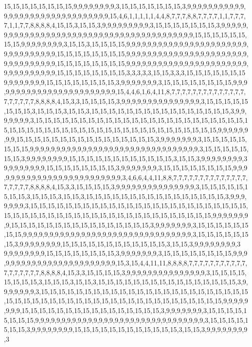 15,15,15,15,15,15,15,15,9,9,9,9,9,9,9,9,3,15,15,15,15,15,15,15,3,9,9,9,9,9,9,9,9,9,9,9,9,9,9,9,9,9,9,9,9,9,9,9,9,9,9,9,9,9,9,9,15,4,6,1,1,1,1,1,4,4,8,7,7,7,8,8,7,7,7,7,1,1,7,7,7,7,1,1,7,7,8,8,8,8,4,15,15,3,15,15,3,9,9,9,9,9,9,9,9,9,3,15,15,15,15,15,15,15,3,9,9,9,9,9,9,9,9,9,9,9,9,9,9,9,9,9,9,9,9,9,9,9,9,9,9,9,9,9,9,9,9,9,9,9,9,9,9,9,9,9,15,15,15,15,15,15,15,15,9,9,9,9,9,9,9,9,3,15,15,3,15,15,15,15,9,9,9,9,9,9,9,9,9,9,9,9,9,9,9,9,9,9,9,9,9,9,9,9,9,9,9,9,9,9,9,9,9,15,15,15,15,15,15,15,15,9,9,9,9,9,9,9,9,9,9,9,9,9,9,9,9,9,9,9,9,9,9,9,9,9,9,9,9,9,9,9,9,9,15,15,15,15,15,15,15,15,9,9,9,9,9,9,9,9,9,9,9,9,9,9,9,9,9,9,9,9,9,9,9,9,9,9,9,9,9,9,9,9,9,15,15,15,15,15,15,15,15,3,3,3,3,3,15,15,3,3,3,15,15,15,15,15,15,15
9,9,9,9,9,9,9,9,15,15,15,15,15,15,15,15,3,9,9,9,9,9,9,9,3,15,15,15,15,15,15,15,15,9,9,9,9,9,9,9,9,9,9,9,9,9,9,9,9,9,9,9,9,9,9,9,9,15,4,4,6,1,6,4,11,8,7,7,7,7,7,7,7,7,7,7,7,7,7,7,7,7,7,7,7,7,8,8,8,8,4,15,3,3,15,15,15,15,3,9,9,9,9,9,9,9,9,9,9,9,9,9,9,9,3,15,15,15,15,15,15,15,15,3,15,15,15,3,15,15,3,15,15,15,15,15,15,15,15,15,15,15,15,15,15,15,15,3,9,9,9,9,9,9,9,3,15,15,15,15,15,15,15,15,15,15,15,15,15,15,15,15,15,15,15,15,15,15,15,15,15,15,15,15,15,15,15,15,15,15,15,15,15,15,15,15,15,15,15,15,15,15,15,15,15,9,9,9,9,9,9,9,9,15,15,15,15,15,15,15,15,15,15,15,15,15,15,15,15,3,9,9,9,9,9,9,9,3,15,15,15,15,15,15,15,15,9,9,9,9,9,9,9,9,9,9,9,9,9,9,9,9,9,9,9,9,9,9,9,9,9,9,9,9,9,9,9,9,3,15,15,15,15,15,15,15,3,9,9,9,9,9,9,9,9,15,15,15,15,15,15,15,15,15,15,15,15,3,15,15,3,9,9,9,9,9,9,9,9,3
9,9,9,9,9,9,9,9,15,15,15,15,15,15,15,15,3,9,9,9,9,9,9,9,3,15,15,15,15,15,15,15,15,9,9,9,9,9,9,9,9,9,9,9,9,9,9,9,9,9,9,9,9,9,9,9,9,9,3,4,6,6,4,4,11,8,8,7,7,7,7,7,7,7,7,7,7,7,7,7,7,7,7,7,7,7,8,8,8,8,4,15,3,3,15,15,15,15,3,9,9,9,9,9,9,9,9,9,9,9,9,9,9,9,3,15,15,15,15,15,15,15,15,3,15,15,15,3,15,15,3,15,15,15,15,15,15,15,15,15,15,15,15,15,15,15,15,3,9,9,9,9,9,9,9,3,15,15,15,15,15,15,15,15,15,15,15,15,15,15,15,15,15,15,15,15,15,15,15,15,15,15,15,15,15,15,15,15,15,15,15,15,15,15,15,15,15,15,15,15,15,15,15,15,15,9,9,9,9,9,9,9,9,15,15,15,15,15,15,15,15,15,15,15,15,15,15,15,15,3,9,9,9,9,9,9,9,3,15,15,15,15,15,15,15,15,9,9,9,9,9,9,9,9,9,9,9,9,9,9,9,9,9,9,9,9,9,9,9,9,9,9,9,9,9,9,9,9,3,15,15,15,15,15,15,15,3,9,9,9,9,9,9,9,9,15,15,15,15,15,15,15,15,15,15,15,15,3,15,15,3,9,9,9,9,9,9,9,9,3
9,9,9,9,9,9,9,9,15,15,15,15,15,15,15,15,3,9,9,9,9,9,9,9,3,15,15,15,15,15,15,15,15,9,9,9,9,9,9,9,9,9,9,9,9,9,9,9,9,9,9,9,9,9,9,9,9,15,3,15,4,4,11,11,8,8,8,8,7,7,7,7,7,7,7,7,7,7,7,7,7,7,7,7,7,7,8,8,8,8,4,15,3,3,15,15,15,15,3,9,9,9,9,9,9,9,9,9,9,9,9,9,9,9,3,15,15,15,15,15,15,15,15,3,15,15,15,3,15,15,3,15,15,15,15,15,15,15,15,15,15,15,15,15,15,15,15,3,9,9,9,9,9,9,9,3,15,15,15,15,15,15,15,15,15,15,15,15,15,15,15,15,15,15,15,15,15,15,15,15,15,15,15,15,15,15,15,15,15,15,15,15,15,15,15,15,15,15,15,15,15,15,15,15,15,9,9,9,9,9,9,9,9,15,15,15,15,15,15,15,15,15,15,15,15,15,15,15,15,3,9,9,9,9,9,9,9,3,15,15,15,15,15,15,15,15,9,9,9,9,9,9,9,9,9,9,9,9,9,9,9,9,9,9,9,9,9,9,9,9,9,9,9,9,9,9,9,9,3,15,15,15,15,15,15,15,3,9,9,9,9,9,9,9,9,15,15,15,15,15,15,15,15,15,15,15,15,3,15,15,3,9,9,9,9,9,9,9,9,3
